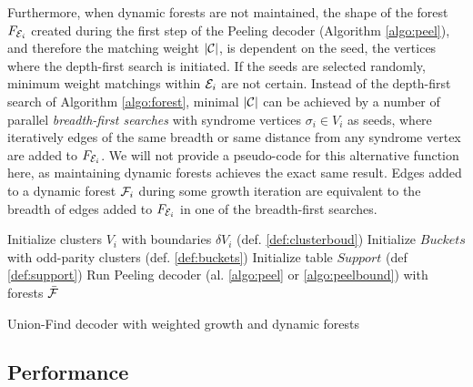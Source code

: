 Furthermore, when dynamic forests are not maintained, the shape of the forest $F_{\mathcal{E}_i}$ created during the first step of the Peeling decoder (Algorithm \ref{algo:peel}), and therefore the matching weight $|\mathcal{C}|$, is dependent on the seed, the vertices where the depth-first search is initiated. If the seeds are selected randomly, minimum weight matchings within $\mathcal{E}_i$ are not certain. Instead of the depth-first search of Algorithm \ref{algo:forest}, minimal $|\mathcal{C}|$ can be achieved by a number of parallel \emph{breadth-first searches} with syndrome vertices $\sigma_i \in V_i$ as seeds, where iteratively edges of the same breadth or same distance from any syndrome vertex are added to $F_{\mathcal{E}_i}$. We will not provide a pseudo-code for this alternative  function here, as maintaining dynamic forests achieves the exact same result. Edges added to a dynamic forest $\mathcal{F}_i$ during some growth iteration are equivalent to the breadth of edges added to $F_{\mathcal{E}_i}$ in one of the breadth-first searches. 

\begin{algorithm}[h]
  \BlankLine
  \BlankLine
  Initialize clusters $V_i$ with boundaries $\delta V_i$ (def. \ref{def:clusterboud})\;
  Initialize $Buckets$ with odd-parity clusters (def. \ref{def:buckets})\;
  Initialize table $Support$ (def \ref{def:support})\;
  \BlankLine
  Run Peeling decoder (al. \ref{algo:peel} or \ref{algo:peelbound}) with forests $\bar{\mathcal{F}}$
  \BlankLine
  \caption{Union-Find decoder with weighted growth and dynamic forests}\label{algo:ufbucketdf}
\end{algorithm}


\subsection{Performance}
